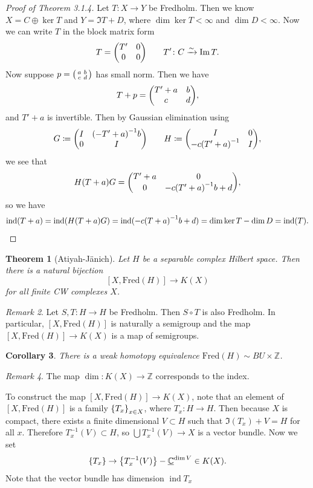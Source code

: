 \documentclass[leqno, openany]{memoir}
\newtheorem{thm}{Theorem}[section]
\newtheorem{cor}[thm]{Corollary}
\theoremstyle{definition}
\theoremstyle{remark}
\newtheorem{rmk}[thm]{Remark}
\theoremstyle{plain}
\theoremstyle{definition}
\theoremstyle{remark}
\newcommand{\C}{\mathbb{C}}
\newcommand{\Z}{\mathbb{Z}}
\newcommand{\mr}[1]{\mathrm{#1}}
\newcommand{\ul}[1]{\underline{#1}}
\DeclareMathOperator{\ind}{ind}
\begin{document}
\begin{proof}[Proof of Theorem 3.1.4] Let $T \colon X \to Y$ be Fredholm. Then
    we know $X = C \oplus \ker T$ and $Y = \Im T + D$, where $\dim \ker T <
    \infty$ and $\dim D < \infty$. Now we can write $T$ in the block matrix
    form \[ T = \mqty(T' & 0 \\ 0 & 0) \qquad T' \colon C \xrightarrow{\sim}
        \Im T. \] Now suppose $p = \begin{psmallmatrix} a & b \\ c & d
        \end{psmallmatrix}$ has small norm. Then we have \[ T + p = \mqty(T' +
        a & b \\ c & d), \] and $T' + a$ is invertible. Then by Gaussian
        elimination using \[ G \coloneqq \mqty(I & {(-T'+a)}^{-1} b \\ 0 & I)
        \qquad H \coloneqq \mqty(I & 0 \\ -c{(T'+a)}^{-1} & I), \] we see that
        \[ H(T+a)G = \mqty(T'+a & 0 \\ 0 & -c{(T'+a)}^{-1} b + d), \] so we
        have \[ \ind(T+a) = \ind(H (T+a)G) = \ind(-c{(T+a)}^{-1}b + d) = \dim
        \ker T - \dim D = \ind(T). \qedhere \] \end{proof}

\begin{thm}[Atiyah-J\"anich] Let $H$ be a separable complex Hilbert space. Then
    there is a natural bijection \[ [X, \mr{Fred}(H)] \to K(X) \] for all
finite CW complexes $X$.  \end{thm}

\begin{rmk} Let $S,T \colon H \to H$ be Fredholm. Then $S \circ T$ is also
Fredholm. In particular, $[X, \mr{Fred}(H)]$ is naturally a semigroup and the
map $[X, \mr{Fred}(H)] \to K(X)$ is a map of semigroups.  \end{rmk}

\begin{cor} There is a weak homotopy equivalence $\mr{Fred}(H) \sim BU \times
\Z$.  \end{cor}

\begin{rmk} The map $\dim \colon K(X) \to \Z$ corresponds to the index.
\end{rmk}

To construct the map $[X, \mr{Fred}(H)] \to K(X)$, note that an element of $[X,
\mr{Fred}(H)]$ is a family $\qty{T_x}_{x \in X}$, where $T_x \colon H \to H$.
Then because $X$ is compact, there exists a finite dimensional $V \subset H$
such that $\Im(T_x) + V = H$ for all $x$. Therefore $T_x^{-1}(V) \subset H$, so
$\bigcup T_x^{-1}(V) \to X$ is a vector bundle. Now we set \[ \qty{T_x} \to
\qty{T_x^{-1}(V)} - \ul{\C}^{\dim V} \in K(X). \] Note that the vector bundle
has dimension $\ind T_x$
\end{document}
